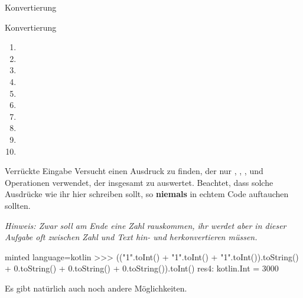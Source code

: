 \begin{task}[points=auto]{Konvertierung }
\begin{subtask*}[points=0]{Konvertierung}
        \begin{solution}
            \begin{multicols}{3}
                \begin{enumerate}
                    \item {}
                    \item {}
                    \item {}
                    \item {}
                    \item {}
                    \item {}
                    \item {}
                    \item {}
                    \item {}
                    \item {}
                \end{enumerate}
            \end{multicols}
        \end{solution}
    \end{subtask*}
    \begin{subtask*}[points=0]{Verrückte Eingabe }
        Versucht einen Ausdruck zu finden, der nur , ,
        ,  und Operationen verwendet, der
        insgesamt zu  auswertet. Beachtet, dass solche Ausdrücke
        wie ihr hier schreiben sollt, so \textbf{niemals} in echtem Code auftauchen
        sollten.

        \textit{Hinweis: Zwar soll am Ende eine Zahl rauskommen, ihr werdet aber in dieser Aufgabe oft zwischen Zahl und Text hin- und herkonvertieren müssen.}

        \begin{solution}
            \begin{codeBlock}[]{minted language=kotlin}
                >>> (("1".toInt() + "1".toInt() + "1".toInt()).toString() + 0.toString() + 0.toString() + 0.toString()).toInt()
                res4: kotlin.Int = 3000
            \end{codeBlock}
            Es gibt natürlich auch noch andere Möglichkeiten.
        \end{solution}
    \end{subtask*}
\end{task}
